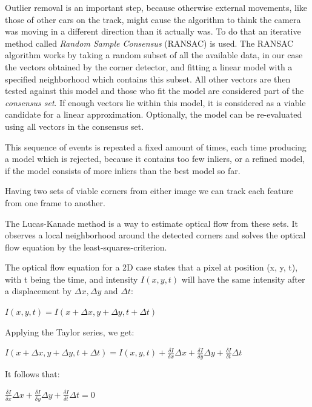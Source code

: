 Outlier removal is an important step, because otherwise external movements, like those of other cars on the track, might cause the algorithm to think the camera was moving in a different direction than it actually was.
To do that an iterative method called \textit{Random Sample Consensus} (RANSAC) is used. 
The RANSAC algorithm works by taking a random subset of all the available data, in our case the vectors obtained by the corner detector, and fitting a linear model with a specified neighborhood which contains this subset. All other vectors are then tested against this model and those who fit the model are considered part of the \textit{consensus set}.
If enough vectors lie within this model, it is considered as a viable candidate for a linear approximation. Optionally, the model can be re-evaluated using all vectors in the consensus set.

This sequence of events is repeated a fixed amount of times, each time producing a model which is rejected, because it contains too few inliers, or a refined model, if the model consists of more inliers than the best model so far.

Having two sets of viable corners from either image we can track each feature from one frame to another. 

The Lucas-Kanade method is a way to estimate optical flow from these sets. It observes a local neighborhood around the detected corners and solves the optical flow equation by the least-squares-criterion.

The optical flow equation for a 2D case states that a pixel at position (x, y, t), with t being the time, and intensity $I(x, y, t)$ will have the same intensity after a displacement by $\Delta x, \Delta y$ and $\Delta t$:

\begin{center}
\large
$I(x, y, t) = I(x + \Delta x, y + \Delta y, t + \Delta t)$
\normalsize
\end{center}

Applying the Taylor series, we get:

\begin{center}
\large
$I(x + \Delta x, y + \Delta y, t + \Delta t) = I(x, y, t) + \frac{\delta I}{\delta x}\Delta x + \frac{\delta I}{\delta y}\Delta y + \frac{\delta I}{\delta t}\Delta t$
\normalsize
\end{center}

It follows that: 

\begin{center}
\large
$\frac{\delta I}{\delta x}\Delta x + \frac{\delta I}{\delta y}\Delta y + \frac{\delta I}{\delta t}\Delta t = 0$
\normalsize
\end{center}

